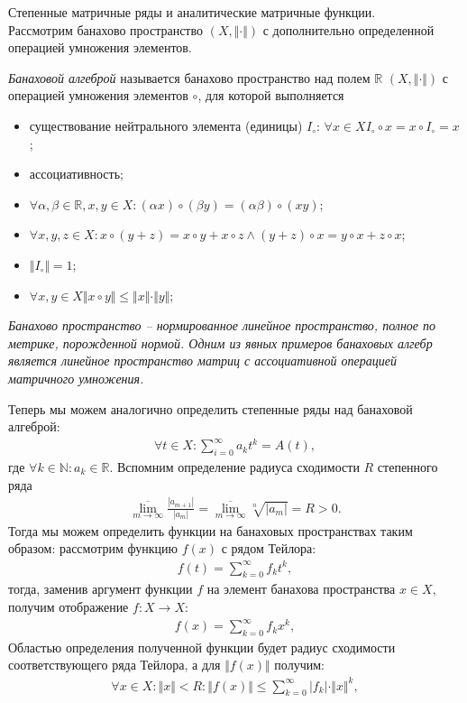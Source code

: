 \documentclass[__main__.tex]{subfiles}
\begin{document}
Степенные матричные ряды и аналитические матричные функции.\\

Рассмотрим банахово пространство $(X,\Vert\cdot\Vert)$ с дополнительно определенной операцией умножения элементов.

\begin{definition}
\emph{Банаховой алгеброй} называется банахово пространство над полем $\mathbb{R}$ $(X,\Vert\cdot\Vert)$ с операцией умножения элементов $\circ$, для которой выполняется
\begin{itemize}
\item
существование нейтрального элемента (единицы) $I_{\circ}$:
$
\forall{x\in X}I_{\circ}\circ{x}=x\circ{I}_{\circ}=x
$;
\item
ассоциативность;
\item
$\forall{\alpha,\beta\in\mathbb{R},x,y\in X}\colon(\alpha x)\circ(\beta y) = (\alpha\beta)\circ(x y)$;
\item
$\forall{x,y,z\in{X}}\colon x\circ(y+z)=x\circ{y}+x\circ{z}\wedge(y+z)\circ{x}=y\circ{x}+z\circ{x}$;
\item
$\Vert I_{\circ} \Vert = 1$;
\item
$\forall{x,y\in X}\Vert x\circ{y} \Vert \le \Vert{x}\Vert\cdot\Vert{y}\Vert$;
\end{itemize}
\end{definition}

\emph{
Банахово пространство -- нормированное линейное пространство, полное по метрике, порожденной нормой. Одним из явных примеров банаховых алгебр является линейное пространство матриц с ассоциативной операцией матричного умножения. 
}

Теперь мы можем аналогично определить степенные ряды над банаховой алгеброй:
\begin{gather}
\forall t\in X \colon \sum_{i=0}^{\infty}a_{k}t^{k}=A(t),
\end{gather}
где $\forall{k\in\mathbb{N}}\colon a_k\in\mathbb{R}$. Вспомним определение радиуса сходимости $R$ степенного ряда
\begin{gather}
\overline{\lim\limits_{m\rightarrow\infty}}\frac{|a_{m+1}|}{|a_{m}|}
=
\overline{\lim\limits_{m\rightarrow\infty}}\sqrt[n]{|a_m|}
=
R>0.
\end{gather}
Тогда мы можем определить функции на банаховых пространствах таким образом: рассмотрим функцию $f(x)$ с рядом Тейлора:
\begin{gather}
f(t)=\sum_{k=0}^{\infty}f_{k}t^{k},
\end{gather}
тогда, заменив аргумент функции $f$ на элемент банахова пространства $x\in X$, получим отображение $f\colon X\rightarrow X$:
\begin{gather}
f(x)=\sum_{k=0}^{\infty}f_{k}x^{k},
\end{gather}
Областью определения полученной функции будет радиус сходимости соответствующего ряда Тейлора, а для $\Vert f(x)\Vert$ получим:
\begin{gather}
\forall{x\in X}\colon\Vert{x}\Vert<R\colon\Vert{f(x)}\Vert\le\sum_{k=0}^{\infty}|f_k|\cdot\Vert{x}\Vert^{k},
\end{gather}
\end{document}
